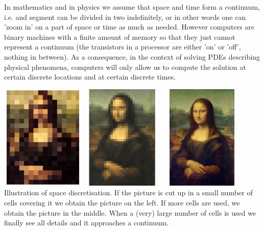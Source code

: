 
In mathematics and in physics we assume that space and time form a continuum, i.e.
and segment can be divided in two indefinitely, or in other words one can 'zoom in'
on a part of space or time as much as needed. 
However computers are binary machines with a finite amount of memory so that they 
just cannot represent a continuum (the transistors in a processor are either 'on' or 'off', 
nothing in between). As a consequence, in the context of solving PDEs
describing physical phenomena, computers will only allow us to compute the solution 
at certain discrete locations and at certain discrete times. 

\begin{center}
\includegraphics[width=4cm,height=5cm]{images/discrete/monalisa1.jpg}
\includegraphics[width=4cm,height=5cm]{images/discrete/monalisa2.jpg}
\includegraphics[width=4cm,height=5cm]{images/discrete/monalisa3.jpg}\\
{\captionfont Illustration of space discretisation. If the picture is cut up 
in a small number of cells covering it we obtain the picture on the left.
If more cells are used, we obtain the picture in the middle. When a (very) large
number of cells is used we finally see all details and it approaches a continuum.}
\end{center}


